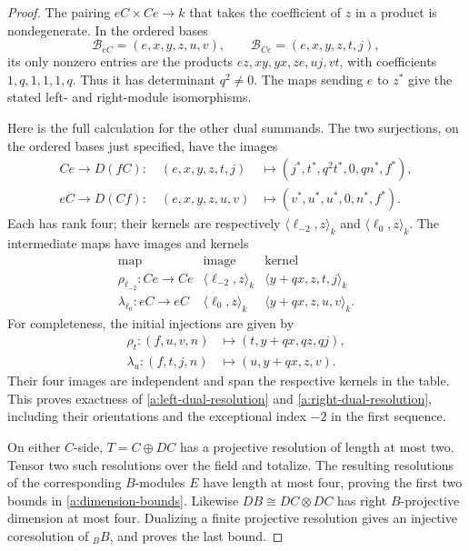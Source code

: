 \begin{proof}
The pairing \(eC\times Ce\to k\) that takes the coefficient of \(z\)
in a product is nondegenerate.  In the ordered bases
\[
\mathcal B_{eC}=(e,x,y,z,u,v),\qquad
\mathcal B_{Ce}=(e,x,y,z,t,j),
\]
its only nonzero entries are the products
\(ez,xy,yx,ze,uj,vt\), with coefficients \(1,q,1,1,1,q\).
Thus it has determinant \(q^2\ne0\).  The maps sending \(e\) to
\(z^*\) give the stated left- and right-module isomorphisms.

Here is the full calculation for the other dual summands.  The two
surjections, on the ordered bases just specified, have the images
\begin{align*}
Ce\longrightarrow D(fC):\quad
(e,x,y,z,t,j)&\longmapsto
(j^*,t^*,q^2t^*,0,qn^*,f^*),\\
eC\longrightarrow D(Cf):\quad
(e,x,y,z,u,v)&\longmapsto
(v^*,u^*,u^*,0,n^*,f^*).
\end{align*}
Each has rank four; their kernels are respectively
\(\langle\ell_{-2},z\rangle_k\) and
\(\langle\ell_0,z\rangle_k\).
The intermediate maps have images and kernels
\[
\begin{array}{c|c|c}
\text{map}&\text{image}&\text{kernel}\\ \hline
\rho_{\ell_{-2}}:Ce\to Ce
 &\langle\ell_{-2},z\rangle_k
 &\langle y+qx,z,t,j\rangle_k\\
\lambda_{\ell_0}:eC\to eC
 &\langle\ell_0,z\rangle_k
 &\langle y+qx,z,u,v\rangle_k.
\end{array}
\]
For completeness, the initial injections are given by
\begin{align*}
\rho_t:(f,u,v,n)&\longmapsto(t,y+qx,qz,qj),\\
\lambda_u:(f,t,j,n)&\longmapsto(u,y+qx,z,v).
\end{align*}
Their four images are independent and span the respective kernels in
the table.  This proves exactness of
\eqref{a:left-dual-resolution} and
\eqref{a:right-dual-resolution}, including their orientations and
the exceptional index \(-2\) in the first sequence.

On either \(C\)-side, \(T=C\oplus DC\) has a projective resolution of
length at most two.  Tensor two such resolutions over the field and
totalize.  The resulting resolutions of the corresponding
\(B\)-modules \(E\) have length at most four, proving the first two
bounds in \eqref{a:dimension-bounds}.  Likewise
\(DB\cong DC\otimes DC\) has right \(B\)-projective dimension at most
four.  Dualizing a finite projective resolution gives an injective
coresolution of \({}_B B\), and proves the last bound.
\end{proof}

